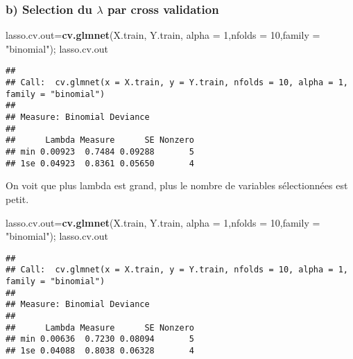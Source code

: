 \documentclass[
]{article}
\newenvironment{Shaded}{\begin{snugshade}}{\end{snugshade}}
\newcommand{\CommentTok}[1]{\textcolor[rgb]{0.56,0.35,0.01}{\textit{#1}}}
\newcommand{\DataTypeTok}[1]{\textcolor[rgb]{0.13,0.29,0.53}{#1}}
\newcommand{\DecValTok}[1]{\textcolor[rgb]{0.00,0.00,0.81}{#1}}
\newcommand{\KeywordTok}[1]{\textcolor[rgb]{0.13,0.29,0.53}{\textbf{#1}}}
\newcommand{\NormalTok}[1]{#1}
\newcommand{\OperatorTok}[1]{\textcolor[rgb]{0.81,0.36,0.00}{\textbf{#1}}}
\newcommand{\StringTok}[1]{\textcolor[rgb]{0.31,0.60,0.02}{#1}}
\begin{document}
\hypertarget{b-selection-du-lambda-par-cross-validation-1}{%
\subsubsection{\texorpdfstring{b) Selection du \(\lambda\) par cross
validation}{b) Selection du \textbackslash lambda par cross validation}}\label{b-selection-du-lambda-par-cross-validation-1}}

\begin{Shaded}
\begin{Highlighting}[]
\NormalTok{lasso.cv.out=}\KeywordTok{cv.glmnet}\NormalTok{(X.train, Y.train, }\DataTypeTok{alpha =} \DecValTok{1}\NormalTok{,}\DataTypeTok{nfolds =} \DecValTok{10}\NormalTok{,}\DataTypeTok{family =} \StringTok{"binomial"}\NormalTok{); lasso.cv.out}
\end{Highlighting}
\end{Shaded}

\begin{verbatim}
## 
## Call:  cv.glmnet(x = X.train, y = Y.train, nfolds = 10, alpha = 1, family = "binomial") 
## 
## Measure: Binomial Deviance 
## 
##      Lambda Measure      SE Nonzero
## min 0.00923  0.7484 0.09288       5
## 1se 0.04923  0.8361 0.05650       4
\end{verbatim}

\begin{Shaded}
\end{Shaded}

On voit que plus lambda est grand, plus le nombre de variables
sélectionnées est petit.

\begin{Shaded}
\begin{Highlighting}[]
\NormalTok{lasso.cv.out=}\KeywordTok{cv.glmnet}\NormalTok{(X.train, Y.train, }\DataTypeTok{alpha =} \DecValTok{1}\NormalTok{,}\DataTypeTok{nfolds =} \DecValTok{10}\NormalTok{,}\DataTypeTok{family =} \StringTok{"binomial"}\NormalTok{); lasso.cv.out}
\end{Highlighting}
\end{Shaded}

\begin{verbatim}
## 
## Call:  cv.glmnet(x = X.train, y = Y.train, nfolds = 10, alpha = 1, family = "binomial") 
## 
## Measure: Binomial Deviance 
## 
##      Lambda Measure      SE Nonzero
## min 0.00636  0.7230 0.08094       5
## 1se 0.04088  0.8038 0.06328       4
\end{verbatim}
\end{document}
